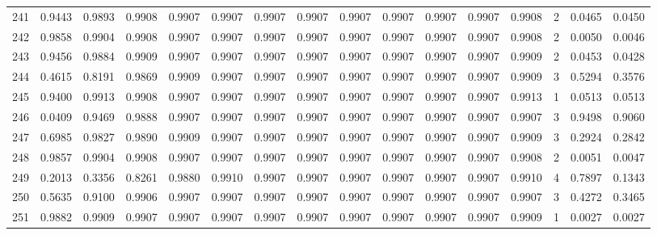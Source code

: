 \begin{tabular}{lrrrrrrrrrrrrrrr}
241 &      0.9443 &  0.9893 &  0.9908 &  0.9907 &  0.9907 &  0.9907 &  0.9907 &  0.9907 &  0.9907 &  0.9907 &   0.9907 &     0.9908 &      2 &                    0.0465 &                     0.0450 \\
242 &      0.9858 &  0.9904 &  0.9908 &  0.9907 &  0.9907 &  0.9907 &  0.9907 &  0.9907 &  0.9907 &  0.9907 &   0.9907 &     0.9908 &      2 &                    0.0050 &                     0.0046 \\
243 &      0.9456 &  0.9884 &  0.9909 &  0.9907 &  0.9907 &  0.9907 &  0.9907 &  0.9907 &  0.9907 &  0.9907 &   0.9907 &     0.9909 &      2 &                    0.0453 &                     0.0428 \\
244 &      0.4615 &  0.8191 &  0.9869 &  0.9909 &  0.9907 &  0.9907 &  0.9907 &  0.9907 &  0.9907 &  0.9907 &   0.9907 &     0.9909 &      3 &                    0.5294 &                     0.3576 \\
245 &      0.9400 &  0.9913 &  0.9908 &  0.9907 &  0.9907 &  0.9907 &  0.9907 &  0.9907 &  0.9907 &  0.9907 &   0.9907 &     0.9913 &      1 &                    0.0513 &                     0.0513 \\
246 &      0.0409 &  0.9469 &  0.9888 &  0.9907 &  0.9907 &  0.9907 &  0.9907 &  0.9907 &  0.9907 &  0.9907 &   0.9907 &     0.9907 &      3 &                    0.9498 &                     0.9060 \\
247 &      0.6985 &  0.9827 &  0.9890 &  0.9909 &  0.9907 &  0.9907 &  0.9907 &  0.9907 &  0.9907 &  0.9907 &   0.9907 &     0.9909 &      3 &                    0.2924 &                     0.2842 \\
248 &      0.9857 &  0.9904 &  0.9908 &  0.9907 &  0.9907 &  0.9907 &  0.9907 &  0.9907 &  0.9907 &  0.9907 &   0.9907 &     0.9908 &      2 &                    0.0051 &                     0.0047 \\
249 &      0.2013 &  0.3356 &  0.8261 &  0.9880 &  0.9910 &  0.9907 &  0.9907 &  0.9907 &  0.9907 &  0.9907 &   0.9907 &     0.9910 &      4 &                    0.7897 &                     0.1343 \\
250 &      0.5635 &  0.9100 &  0.9906 &  0.9907 &  0.9907 &  0.9907 &  0.9907 &  0.9907 &  0.9907 &  0.9907 &   0.9907 &     0.9907 &      3 &                    0.4272 &                     0.3465 \\
251 &      0.9882 &  0.9909 &  0.9907 &  0.9907 &  0.9907 &  0.9907 &  0.9907 &  0.9907 &  0.9907 &  0.9907 &   0.9907 &     0.9909 &      1 &                    0.0027 &                     0.0027 \\

\end{tabular}
